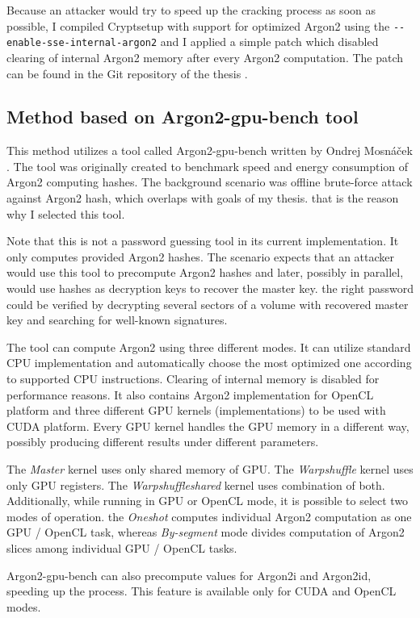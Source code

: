 \documentclass[nolof]{fithesis3}
\begin{document}
Because an attacker would try to speed up the cracking process as soon as possible, I compiled Cryptsetup with support for optimized Argon2 using the \verb+--enable-sse-internal-argon2+ and I applied a simple patch which disabled clearing of internal Argon2 memory after every Argon2 computation. The patch can be found in the Git repository of the thesis \parencite{thesisrepo}.

\subsection{Method based on Argon2-gpu-bench tool}
This method utilizes a tool called Argon2-gpu-bench written by Ondrej Mosnáček \parencite{argon2gpu}. The tool was originally created to benchmark speed and energy consumption of Argon2 computing hashes. The background scenario was offline brute-force attack against Argon2 hash, which overlaps with goals of my thesis. that is the reason why I selected this tool.

Note that this is not a password guessing tool in its current implementation. It only computes provided Argon2 hashes. The scenario expects that an attacker would use this tool to precompute Argon2 hashes and later, possibly in parallel, would use hashes as decryption keys to recover the master key. the right password could be verified by decrypting several sectors of a volume with recovered master key and searching for well-known signatures.

The tool can compute Argon2 using three different modes. It can utilize standard CPU implementation and automatically choose the most optimized one according to supported CPU instructions. Clearing of internal memory is disabled for performance reasons. It also contains Argon2 implementation for OpenCL platform and three different GPU kernels (implementations) to be used with CUDA platform. Every GPU kernel handles the GPU memory in a different way, possibly producing different results under different parameters.

The \emph{Master} kernel uses only shared memory of GPU. The \emph{Warpshuffle} kernel uses only GPU registers. The \emph{Warpshuffleshared} kernel uses combination of both. Additionally, while running in GPU or OpenCL mode, it is possible to select two modes of operation. the \emph{Oneshot} computes individual Argon2 computation as one GPU / OpenCL task, whereas \emph{By-segment} mode divides computation of Argon2 slices among individual GPU / OpenCL tasks.

Argon2-gpu-bench can also precompute values for Argon2i and Argon2id, speeding up the process. This feature is available only for CUDA and OpenCL modes.
\end{document}
